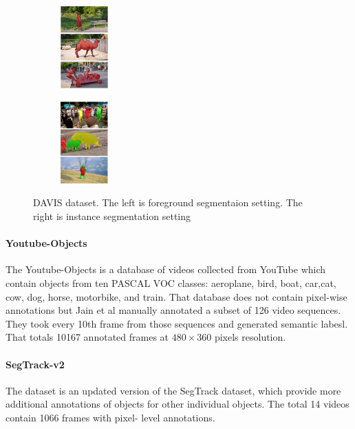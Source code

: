 \begin{figure}[ht]
    \centering
    \begin{subfigure}{}
        \includegraphics[width=0.2\textwidth]{figure/Davis_primary1.png}  
    \end{subfigure}
    \begin{subfigure}{}
        \includegraphics[width=0.2\textwidth]{figure/Davis_instance2.png}
    \end{subfigure}
    \caption{DAVIS dataset. The left is foreground segmentaion setting. The right is instance segmentation setting}
\end{figure}


\paragraph{Youtube-Objects~\cite{Youtube}} 
The Youtube-Objects is a database of videos collected from YouTube which contain objects from ten PASCAL VOC classes: 
aeroplane, bird, boat, car,cat, cow, dog, horse, motorbike, and train.
That database does not contain pixel-wise annotations but Jain et al 
manually annotated a subset of 126 video sequences.
They took every 10th frame from those sequences and generated semantic labesl. 
That totals 10167 annotated frames at $480\times 360$ pixels resolution.

\paragraph{SegTrack-v2~\cite{SegTrack}}
The dataset is an updated version of the SegTrack dataset, which provide more additional
annotations of objects for other individual objects. The total 14 videos contain 1066 frames with pixel-
level annotations. 





